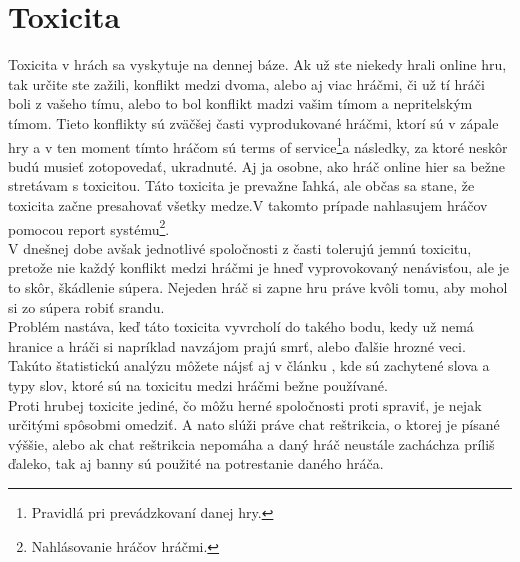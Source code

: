 \documentclass[twoside,twocolumn]{article}
\begin{document}

\section{Toxicita}

Toxicita v hrách sa vyskytuje na dennej báze. Ak už ste niekedy hrali online hru, tak určite ste zažili, konflikt medzi dvoma, alebo aj viac hráčmi, či už tí hráči boli z vašeho tímu, alebo to bol konflikt madzi vašim tímom a nepritelským tímom. Tieto konflikty sú zväčšej časti vyprodukované hráčmi, ktorí sú v zápale hry a v ten moment tímto hráčom sú terms of service\footnote[1]{Pravidlá pri prevádzkovaní danej hry.}a následky, za ktoré neskôr budú musieť zotopovedať, ukradnuté. Aj ja osobne, ako hráč online hier sa bežne stretávam s toxicitou. Táto toxicita je prevažne ľahká, ale občas sa stane, že toxicita začne presahovať všetky medze.V takomto prípade nahlasujem hráčov pomocou report systému\footnote[2]{Nahlásovanie hráčov hráčmi.}.\\
V dnešnej dobe avšak jednotlivé spoločnosti z časti tolerujú jemnú toxicitu, pretože nie každý konflikt medzi hráčmi je hneď vyprovokovaný nenávisťou, ale je to skôr, škádlenie súpera. Nejeden hráč si zapne hru práve kvôli tomu, aby mohol si zo súpera robiť srandu.\\
Problém nastáva, keď táto toxicita vyvrcholí do takého bodu, kedy už nemá hranice a hráči si napríklad navzájom prajú smrť, alebo ďalšie hrozné veci. Takúto štatistickú analýzu môžete nájsť aj v článku \cite{ghosh2021analyzing}, kde sú zachytené slova a typy slov, ktoré sú na toxicitu medzi hráčmi bežne používané.\\ 
Proti hrubej toxicite jediné, čo môžu herné spoločnosti proti spraviť, je nejak určitými spôsobmi omedziť. A nato slúži práve chat reštrikcia, o ktorej je písané výššie, alebo ak chat reštrikcia nepomáha a daný hráč neustále zacháchza príliš ďaleko, tak aj banny sú použité na potrestanie daného hráča.\\




\end{document}
